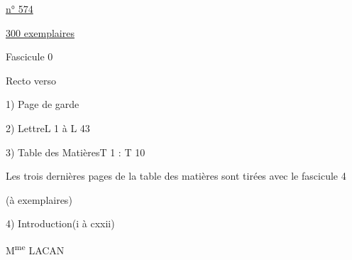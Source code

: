 \hfill\uline{n° 574}

\hfill\uline{300 exemplaires}

Fascicule 0

Recto verso

1) Page de garde

2) Lettre\qquad L 1 à L 43

3) Table des Matières\qquad T 1 : T 10

Les trois dernières pages de la table des matières sont tirées avec le fascicule 4

(à  exemplaires)

4) Introduction\qquad (i à cxxii)

\hfill M\textsuperscript{me} LACAN

